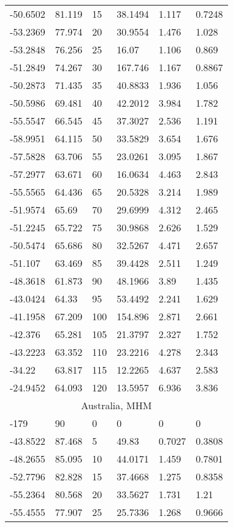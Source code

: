 \begin{longtable}[c]{@{}llllll@{}}
-50.6502 & 81.119 & 15 & 38.1494 & 1.117 & 0.7248 \\
-53.2369 & 77.974 & 20 & 30.9554 & 1.476 & 1.028 \\
-53.2848 & 76.256 & 25 & 16.07 & 1.106 & 0.869 \\
-51.2849 & 74.267 & 30 & 167.746 & 1.167 & 0.8867 \\
-50.2873 & 71.435 & 35 & 40.8833 & 1.936 & 1.056 \\
-50.5986 & 69.481 & 40 & 42.2012 & 3.984 & 1.782 \\
-55.5547 & 66.545 & 45 & 37.3027 & 2.536 & 1.191 \\
-58.9951 & 64.115 & 50 & 33.5829 & 3.654 & 1.676 \\
-57.5828 & 63.706 & 55 & 23.0261 & 3.095 & 1.867 \\
-57.2977 & 63.671 & 60 & 16.0634 & 4.463 & 2.843 \\
-55.5565 & 64.436 & 65 & 20.5328 & 3.214 & 1.989 \\
-51.9574 & 65.69 & 70 & 29.6999 & 4.312 & 2.465 \\
-51.2245 & 65.722 & 75 & 30.9868 & 2.626 & 1.529 \\
-50.5474 & 65.686 & 80 & 32.5267 & 4.471 & 2.657 \\
-51.107 & 63.469 & 85 & 39.4428 & 2.511 & 1.249 \\
-48.3618 & 61.873 & 90 & 48.1966 & 3.89 & 1.435 \\
-43.0424 & 64.33 & 95 & 53.4492 & 2.241 & 1.629 \\
-41.1958 & 67.209 & 100 & 154.896 & 2.871 & 2.661 \\
-42.376 & 65.281 & 105 & 21.3797 & 2.327 & 1.752 \\
-43.2223 & 63.352 & 110 & 23.2216 & 4.278 & 2.343 \\
-34.22 & 63.817 & 115 & 12.2265 & 4.637 & 2.583 \\
-24.9452 & 64.093 & 120 & 13.5957 & 6.936 & 3.836 \\
\multicolumn{6}{c}{Australia, MHM} \\
-179 & 90 & 0 & 0 & 0 & 0 \\
-43.8522 & 87.468 & 5 & 49.83 & 0.7027 & 0.3808 \\
-48.2655 & 85.095 & 10 & 44.0171 & 1.459 & 0.7801 \\
-52.7796 & 82.828 & 15 & 37.4668 & 1.275 & 0.8358 \\
-55.2364 & 80.568 & 20 & 33.5627 & 1.731 & 1.21 \\
-55.4555 & 77.907 & 25 & 25.7336 & 1.268 & 0.9666 \\

\end{longtable}
